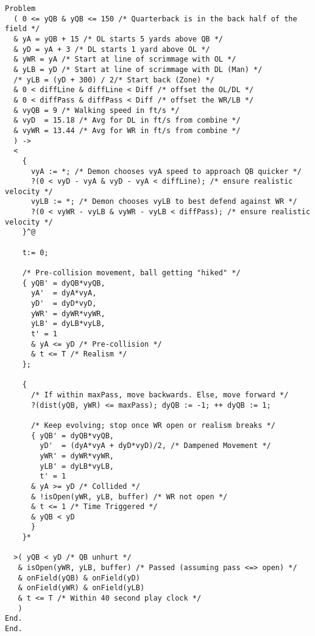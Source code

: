 \begin{lstlisting}
Problem
  ( 0 <= yQB & yQB <= 150 /* Quarterback is in the back half of the field */
  & yA = yQB + 15 /* OL starts 5 yards above QB */
  & yD = yA + 3 /* DL starts 1 yard above OL */
  & yWR = yA /* Start at line of scrimmage with OL */
  & yLB = yD /* Start at line of scrimmage with DL (Man) */
  /* yLB = (yD + 300) / 2/* Start back (Zone) */
  & 0 < diffLine & diffLine < Diff /* offset the OL/DL */
  & 0 < diffPass & diffPass < Diff /* offset the WR/LB */
  & vyQB = 9 /* Walking speed in ft/s */
  & vyD  = 15.18 /* Avg for DL in ft/s from combine */
  & vyWR = 13.44 /* Avg for WR in ft/s from combine */
  ) ->
  <
    {
      vyA := *; /* Demon chooses vyA speed to approach QB quicker */
      ?(0 < vyD - vyA & vyD - vyA < diffLine); /* ensure realistic velocity */
      vyLB := *; /* Demon chooses vyLB to best defend against WR */
      ?(0 < vyWR - vyLB & vyWR - vyLB < diffPass); /* ensure realistic velocity */
    }^@

    t:= 0;

    /* Pre-collision movement, ball getting "hiked" */
    { yQB' = dyQB*vyQB,
      yA'  = dyA*vyA,
      yD'  = dyD*vyD,
      yWR' = dyWR*vyWR,
      yLB' = dyLB*vyLB,
      t' = 1
      & yA <= yD /* Pre-collision */
      & t <= T /* Realism */
    };

    {
      /* If within maxPass, move backwards. Else, move forward */
      ?(dist(yQB, yWR) <= maxPass); dyQB := -1; ++ dyQB := 1;

      /* Keep evolving; stop once WR open or realism breaks */
      { yQB' = dyQB*vyQB,
        yD'  = (dyA*vyA + dyD*vyD)/2, /* Dampened Movement */
        yWR' = dyWR*vyWR,
        yLB' = dyLB*vyLB,
        t' = 1
      & yA >= yD /* Collided */
      & !isOpen(yWR, yLB, buffer) /* WR not open */
      & t <= 1 /* Time Triggered */
      & yQB < yD
      }
    }*

  >( yQB < yD /* QB unhurt */
   & isOpen(yWR, yLB, buffer) /* Passed (assuming pass <=> open) */
   & onField(yQB) & onField(yD)
   & onField(yWR) & onField(yLB)
   & t <= T /* Within 40 second play clock */
   )
End.
End.


\end{lstlisting}